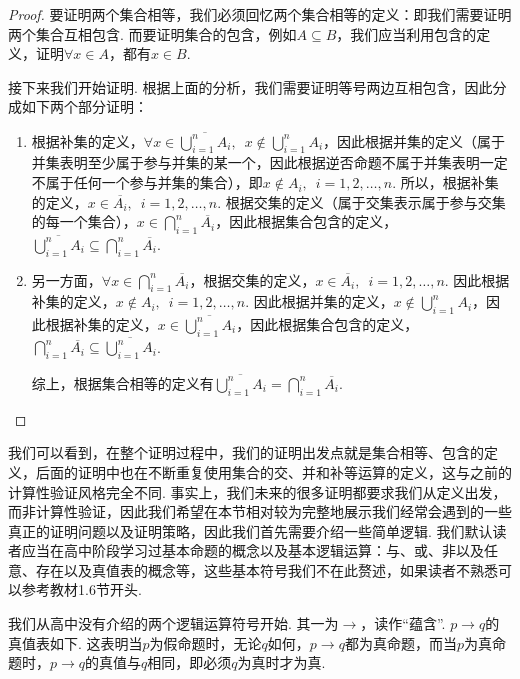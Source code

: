 \begin{proof}
    要证明两个集合相等，我们必须回忆两个集合相等的定义：即我们需要证明两个集合互相包含. 而要证明集合的包含，例如$A\subseteq B$，我们应当利用包含的定义，证明$\forall x\in A$，都有$x\in B$.

    接下来我们开始证明. 根据上面的分析，我们需要证明等号两边互相包含，因此分成如下两个部分证明：
    \begin{enumerate}
        \item 根据补集的定义，$\forall x\in \overline{\displaystyle\bigcup_{i=1}^nA_i},\enspace x\notin \displaystyle\bigcup_{i=1}^nA_i$，因此根据并集的定义（属于并集表明至少属于参与并集的某一个，因此根据逆否命题不属于并集表明一定不属于任何一个参与并集的集合），即$x\notin A_i,\enspace i=1,2,\ldots,n$. 所以，根据补集的定义，$x\in \overline{A_i},\enspace i=1,2,\ldots,n$. 根据交集的定义（属于交集表示属于参与交集的每一个集合），$x\in \displaystyle\bigcap_{i=1}^n\overline{A_i}$，因此根据集合包含的定义，$\overline{\displaystyle\bigcup_{i=1}^nA_i}\subseteq \displaystyle\bigcap_{i=1}^n\overline{A_i}$.

        \item 另一方面，$\forall x\in \displaystyle\bigcap_{i=1}^n\overline{A_i}$，根据交集的定义，$x\in \overline{A_i},\enspace i=1,2,\ldots,n$. 因此根据补集的定义，$x\notin A_i,\enspace i=1,2,\ldots,n$. 因此根据并集的定义，$x\notin \displaystyle\bigcup_{i=1}^nA_i$，因此根据补集的定义，$x\in \overline{\displaystyle\bigcup_{i=1}^nA_i}$，因此根据集合包含的定义，$\displaystyle\bigcap_{i=1}^n\overline{A_i}\subseteq \overline{\displaystyle\bigcup_{i=1}^nA_i}$.

              综上，根据集合相等的定义有$\overline{\displaystyle\bigcup_{i=1}^nA_i}=\displaystyle\bigcap_{i=1}^n\overline{A_i}$.
    \end{enumerate}
\end{proof}

我们可以看到，在整个证明过程中，我们的证明出发点就是集合相等、包含的定义，后面的证明中也在不断重复使用集合的交、并和补等运算的定义，这与之前的计算性验证风格完全不同. 事实上，我们未来的很多证明都要求我们从定义出发，而非计算性验证，因此我们希望在本节相对较为完整地展示我们经常会遇到的一些真正的证明问题以及证明策略，因此我们首先需要介绍一些简单逻辑. 我们默认读者应当在高中阶段学习过基本命题的概念以及基本逻辑运算：与、或、非以及任意、存在以及真值表的概念等，这些基本符号我们不在此赘述，如果读者不熟悉可以参考教材1.6节开头.

我们从高中没有介绍的两个逻辑运算符号开始. 其一为$\to$，读作``蕴含''. $p\to q$的真值表如下. 这表明当$p$为假命题时，无论$q$如何，$p\to q$都为真命题，而当$p$为真命题时，$p\to q$的真值与$q$相同，即必须$q$为真时才为真.

